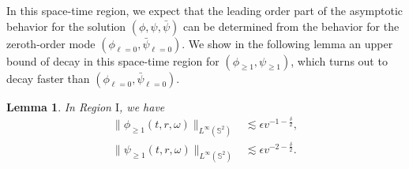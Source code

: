 \documentclass[a4paper,reqno]{amsart}
\newtheorem{lemma}[theorem]{Lemma}
\theoremstyle{definition}
\numberwithin{equation}{section}
\begin{document}

 
In this space-time region, we expect that the leading order part of the asymptotic behavior for the solution $(\phi,\psi,\bar\psi)$ can be determined from the behavior for the zeroth-order mode $(\phi_{\ell=0},\bar\psi_{\ell=0})$. We show in the following lemma an upper bound of decay in this space-time region for $(\phi_{\ge 1},\psi_{\ge 1})$,  which turns out to decay faster than $(\phi_{\ell=0},\bar{\psi}_{\ell=0})$.

\begin{lemma}\label{le:region1}
    In Region $\mathrm{I}$, we have 
    \begin{subequations}
    \label{eq:esti:geq1modes:regionI}
    \begin{align}
    \label{eq:esti:geq1modes:regionI:phi}
        \|\phi_{\ge 1}(t,r,\omega)\|_{L^{\infty}(\mathbb{S}^{2})}&\lesssim \epsilon v^{-1-\frac{\delta}{2}},\\
        \label{eq:esti:geq1modes:regionI:psi}
    \|\psi_{\ge 1}(t,r,\omega)\|_{L^{\infty}(\mathbb{S}^{2})}&\lesssim \epsilon v^{-2-\frac{\delta}{2}}.
    \end{align}
    \end{subequations}
\end{lemma}
\end{document}
